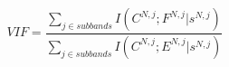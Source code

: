 \begin{equation}
VIF = \frac{\sum_{j\in subbands}{I(C^{N,j}; F^{N,j}|s^{N,j})}}{\sum_{j\in subbands}{I(C^{N,j}; E^{N,j}|s^{N,j})}}
\end{equation}